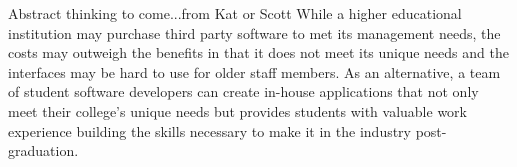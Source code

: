 Abstract thinking to come...from Kat or Scott
While a higher educational institution may purchase third party software to met its management needs, the costs may outweigh the benefits in that it does not meet its unique needs and the interfaces may be hard to use for older staff members. As an alternative, a team of student software developers can create in-house applications that not only meet their college's unique needs but provides students with valuable work experience building the skills necessary to make it in the industry post-graduation.